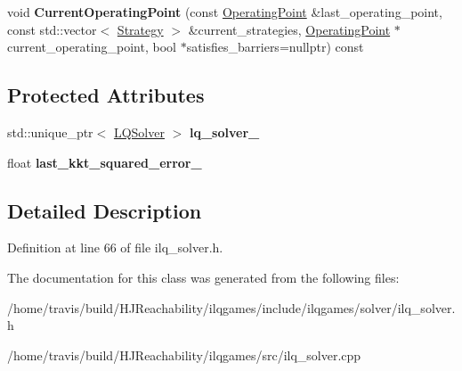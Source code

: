 \begin{DoxyCompactItemize}
\item 
void {\bfseries Current\+Operating\+Point} (const \hyperlink{structilqgames_1_1_operating_point}{Operating\+Point} \&last\+\_\+operating\+\_\+point, const std\+::vector$<$ \hyperlink{structilqgames_1_1_strategy}{Strategy} $>$ \&current\+\_\+strategies, \hyperlink{structilqgames_1_1_operating_point}{Operating\+Point} $\ast$current\+\_\+operating\+\_\+point, bool $\ast$satisfies\+\_\+barriers=nullptr) const \hypertarget{classilqgames_1_1_i_l_q_solver_ae5dd6b941a6caa2091547e27b7ca8869}{}\label{classilqgames_1_1_i_l_q_solver_ae5dd6b941a6caa2091547e27b7ca8869}

\end{DoxyCompactItemize}
\subsection*{Protected Attributes}
\begin{DoxyCompactItemize}
\item 
std\+::unique\+\_\+ptr$<$ \hyperlink{classilqgames_1_1_l_q_solver}{L\+Q\+Solver} $>$ {\bfseries lq\+\_\+solver\+\_\+}\hypertarget{classilqgames_1_1_i_l_q_solver_afb4b2fed2450e965d347dd6a38a33bb6}{}\label{classilqgames_1_1_i_l_q_solver_afb4b2fed2450e965d347dd6a38a33bb6}

\item 
float {\bfseries last\+\_\+kkt\+\_\+squared\+\_\+error\+\_\+}\hypertarget{classilqgames_1_1_i_l_q_solver_aad3c6e1b11d4c17ff63d87b3755c11b9}{}\label{classilqgames_1_1_i_l_q_solver_aad3c6e1b11d4c17ff63d87b3755c11b9}

\end{DoxyCompactItemize}


\subsection{Detailed Description}


Definition at line 66 of file ilq\+\_\+solver.\+h.



The documentation for this class was generated from the following files\+:\begin{DoxyCompactItemize}
\item 
/home/travis/build/\+H\+J\+Reachability/ilqgames/include/ilqgames/solver/ilq\+\_\+solver.\+h\item 
/home/travis/build/\+H\+J\+Reachability/ilqgames/src/ilq\+\_\+solver.\+cpp\end{DoxyCompactItemize}
